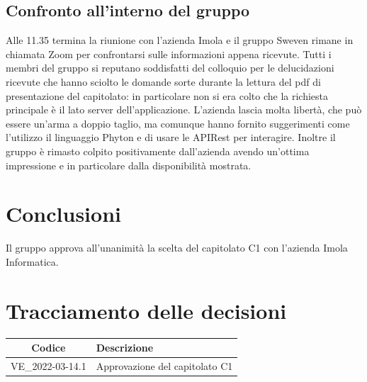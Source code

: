 \documentclass[12pt, a4paper,table]{article}
\begin{document}
		\subsection{Confronto all'interno del gruppo}
		Alle 11.35 termina la riunione con l'azienda Imola e il gruppo Sweven rimane in chiamata Zoom
		per confrontarsi sulle informazioni appena ricevute. \newline
		Tutti i membri del gruppo si reputano soddisfatti del colloquio per le delucidazioni ricevute 
		che hanno sciolto le domande sorte durante la lettura del pdf di presentazione del capitolato:
		in particolare non si era colto che la richiesta principale è il lato server dell'applicazione.
		L'azienda lascia molta libertà, che può essere un'arma a doppio taglio, ma comunque hanno 
		fornito suggerimenti come l'utilizzo il linguaggio Phyton e di usare le APIRest per interagire.
		Inoltre il gruppo è rimasto colpito positivamente dall'azienda avendo un'ottima impressione e
		in particolare dalla disponibilità mostrata.
	
	\section{Conclusioni}
	Il gruppo approva all'unanimità la scelta del capitolato C1 con l'azienda Imola Informatica.
	\newpage
	
	\section*{Tracciamento delle decisioni}
	\renewcommand{\arraystretch}{1.8} %
	\begin{tabular}{ |c|l| }
		\hline
		\textbf{Codice} & \textbf{Descrizione} \\
		\hline
		VE\_2022-03-14.1 & Approvazione del capitolato C1 \\
		\hline
	\end{tabular}
\end{document}
